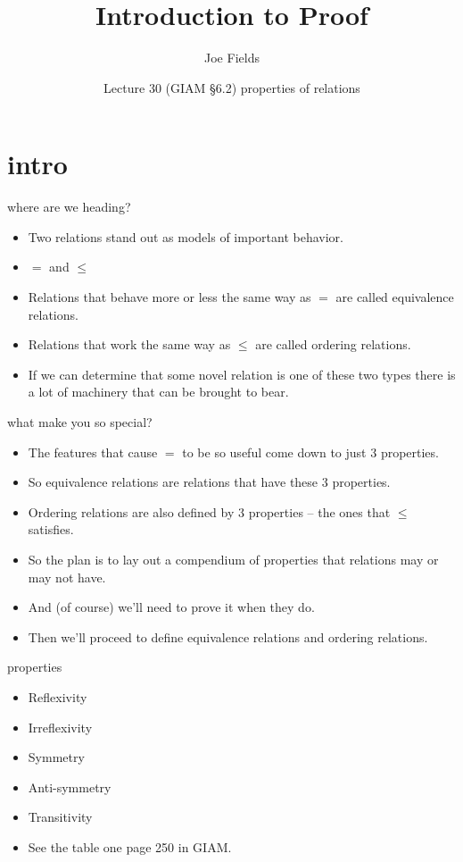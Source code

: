 \documentclass[handout,landscape]{beamer}
\author{Joe Fields}
\title{Introduction to Proof}
\date{Lecture 30 (GIAM \S 6.2) \newline properties of relations}
\institute[SCSU]{ {\tt fieldsj1@southernct.edu} }
\begin{document}
\begin{frame}[plain]
  \titlepage
\end{frame}

\section{intro}

\begin{frame}{where are we heading?}
\begin{itemize}
\item Two relations stand out as models of important behavior.\pause
\item $=$ and $\leq$ \pause
\item Relations that behave more or less the same way as $=$ are called equivalence relations. \pause
\item Relations that work the same way as $\leq$ are called ordering relations. \pause
\item If we can determine that some novel relation is one of these two types there is a lot of machinery that can be brought to bear.
\end{itemize}
\end{frame}

\begin{frame}{what make you so special?}
\begin{itemize}
\item The features that cause $=$ to be so useful come down to just 3 properties. \pause
\item So equivalence relations are relations that have these 3 properties.\pause
\item Ordering relations are also defined by 3 properties -- the ones that $\leq$ satisfies. \pause
\item So the plan is to lay out a compendium of properties that relations may or may not have.\pause
\item And (of course) we'll need to prove it when they do.\pause
\item Then we'll proceed to define equivalence relations and ordering relations.
\end{itemize}
\end{frame}

\begin{frame}{properties}
\begin{itemize}
\item Reflexivity \pause
\item Irreflexivity \pause
\item Symmetry \pause
\item Anti-symmetry \pause
\item Transitivity \pause
\item See the table one page 250 in GIAM.
\end{itemize}

\end{frame}
\end{document}
